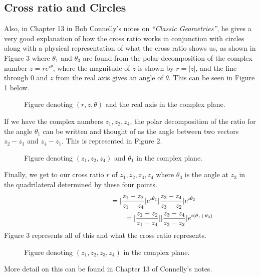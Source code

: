\documentclass[a4paper,11pt]{article}
\theoremstyle{definition}
\begin{document}
\subsection{Cross ratio and Circles}
Also, in Chapter 13 in Bob Connelly's notes on \textit{``Classic Geometries''}, he gives a very good explanation of how the cross ratio works in conjunction with circles along with a physical representation of what the cross ratio shows us, as shown in Figure 3 where $\theta_1$ and $\theta_3$ are found from the polar decomposition of the complex number $z = re^{i\theta}$, where the magnitude of $z$ is shown by $r = |z|$, and the line through $0$ and $z$ from the real axis gives an angle of $\theta$. This can be seen in Figure 1 below.
\begin{figure}[h]
    \caption{Figure denoting $(r, z, \theta)$ and the real axis in the complex plane.}
    \label{fig:cross_ratio1}
\end{figure}
If we have the complex numbers $z_1, z_2, z_4$, the polar decomposition of the ratio for the angle $\theta_1$ can be written and thought of as the angle between two vectors $z_2-z_1$ and $z_4-z_1$. This is represented in Figure 2.
\begin{figure}[h]
    \caption{Figure denoting $(z_1, z_2, z_4)$ and $\theta_1$ in the complex plane.}
    \label{fig:cross_ratio2}
\end{figure}
Finally, we get to our cross ratio $r$ of $z_1, z_2, z_3, z_4$ where $\theta_3$ is the angle at $z_3$ in the quadrilateral determined by these four points. 
\begin{align}
    \phantom{r = (\frac{z_1-z_2}{z_1-z_4})(\frac{z_3-z_4}{z_3-z_2})}
    &\begin{aligned}
        \mathllap{} &= |\frac{z_1-z_2}{z_1-z_4}|e^{i\theta_1}|\frac{z_3-z_4}{z_3-z_2}|e^{i\theta_3}\\
            &\qquad = |\frac{z_1-z_2}{z_1-z_4}||\frac{z_3-z_4}{z_3-z_2}|e^{i(\theta_1+\theta_3)}
    \end{aligned}
\end{align}
Figure 3 represents all of this and what the cross ratio represents.
\begin{figure}[h]
    \caption{Figure denoting $(z_1, z_2, z_3, z_4)$ in the complex plane.}
    \label{fig:cross_ratio3}
\end{figure}
More detail on this can be found in Chapter 13 of Connelly's notes. {\autocite{Connelly_2017_Math}}\\
\end{document}
